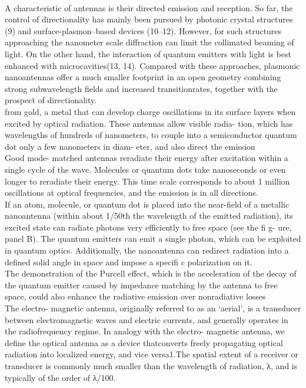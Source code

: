 		\\
		A characteristic of antennas is their directed emission and reception. So far, the control of directionality has mainly been pursued by photonic crystal structures (9) and surface-plasmon–based devices (10–12). However, for such structures approaching the nanometer scale diffraction can limit the collimated beaming of light. On the other hand, the interaction of quantum emitters with light is best enhanced with microcavities(13, 14). Compared with these approaches, plasmonic nanoantennas offer a much smaller footprint in an open geometry combining strong subwavelength fields and increased transitionrates, together with the prospect of directionality.
		\\
		\cite{Giessen2010}
		from gold, a metal that can develop charge oscillations in its surface layers when excited by optical radiation. These antennas allow visible radia- tion, which has wavelengths of hundreds of nanometers, to couple into a semiconductor quantum dot only a few nanometers in diam- eter, and also direct the emission
		\\
		Good mode- matched antennas reradiate their energy after excitation within a single cycle of the wave. Molecules or quantum dots take nanoseconds or even longer to reradiate their energy. This time scale corresponds to about 1 million oscillations at optical frequencies, and the emission is in all directions.
		\\
		If an atom, molecule, or quantum dot is placed into the near-field of a metallic nanoantenna (within about 1/50th the wavelength of the emitted radiation), its excited state can radiate photons very efficiently to free space (see the fi g- ure, panel B). The quantum emitters can emit a single photon, which can be exploited in quantum optics. Additionally, the nanoantenna can redirect radiation into a defined solid angle in space and impose a specifi c polarization on it.
		\\
		The demonstration of the Purcell effect, which is the acceleration of the decay of the quantum emitter caused by impedance matching by the antenna to free space, could also enhance the radiative emission over nonradiative losses
		\\
		\cite{Novotny2011}
		The electro- magnetic antenna, originally referred to as an ‘aerial’, is a transducer between electromagnetic waves and electric currents, and generally operates in the radiofrequency regime. In analogy with the electro- magnetic antenna, we define the optical antenna as a device thatconverts freely propagating optical radiation into localized energy, and vice versa1.The spatial extent of a receiver or transducer is commonly much smaller than the wavelength of radiation, λ, and is typically of the order of λ/100.
